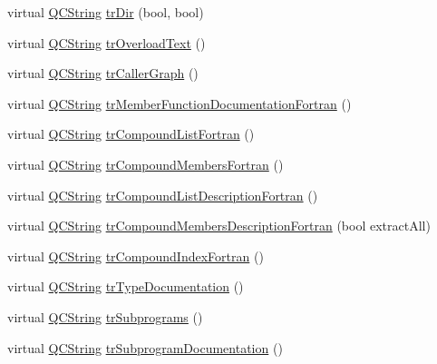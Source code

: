 \begin{DoxyCompactItemize}
\item 
virtual \hyperlink{class_q_c_string}{Q\-C\-String} \hyperlink{class_translator_chinesetraditional_a243d895180b4c15f7872f6b305d9c7d5}{tr\-Dir} (bool, bool)
\item 
virtual \hyperlink{class_q_c_string}{Q\-C\-String} \hyperlink{class_translator_chinesetraditional_ac5436cb286c48cd540d0cdce200a82b9}{tr\-Overload\-Text} ()
\item 
virtual \hyperlink{class_q_c_string}{Q\-C\-String} \hyperlink{class_translator_chinesetraditional_ae1d7d38cc426cd25124b1658b1125841}{tr\-Caller\-Graph} ()
\item 
virtual \hyperlink{class_q_c_string}{Q\-C\-String} \hyperlink{class_translator_chinesetraditional_a006270b30df57f83fe40ad0ed617652e}{tr\-Member\-Function\-Documentation\-Fortran} ()
\item 
virtual \hyperlink{class_q_c_string}{Q\-C\-String} \hyperlink{class_translator_chinesetraditional_a17985bd956c4940e53e169cadb659c2b}{tr\-Compound\-List\-Fortran} ()
\item 
virtual \hyperlink{class_q_c_string}{Q\-C\-String} \hyperlink{class_translator_chinesetraditional_add44aa8baf655554ec74dbfac0d43f71}{tr\-Compound\-Members\-Fortran} ()
\item 
virtual \hyperlink{class_q_c_string}{Q\-C\-String} \hyperlink{class_translator_chinesetraditional_a10aa72b35051f95ba30f2b0312ce705c}{tr\-Compound\-List\-Description\-Fortran} ()
\item 
virtual \hyperlink{class_q_c_string}{Q\-C\-String} \hyperlink{class_translator_chinesetraditional_a0c98da65b5772e9c2876855a42d44127}{tr\-Compound\-Members\-Description\-Fortran} (bool extract\-All)
\item 
virtual \hyperlink{class_q_c_string}{Q\-C\-String} \hyperlink{class_translator_chinesetraditional_a933624b6cffb8fdc03e9fc4110640fc9}{tr\-Compound\-Index\-Fortran} ()
\item 
virtual \hyperlink{class_q_c_string}{Q\-C\-String} \hyperlink{class_translator_chinesetraditional_ae031421205271f1a32fa3838a79b8902}{tr\-Type\-Documentation} ()
\item 
virtual \hyperlink{class_q_c_string}{Q\-C\-String} \hyperlink{class_translator_chinesetraditional_a8d4e1de8fb5c2af1fd073c682556f999}{tr\-Subprograms} ()
\item 
virtual \hyperlink{class_q_c_string}{Q\-C\-String} \hyperlink{class_translator_chinesetraditional_add6df0842eb6016d108814567d677055}{tr\-Subprogram\-Documentation} ()
\item 

\end{DoxyCompactItemize}
